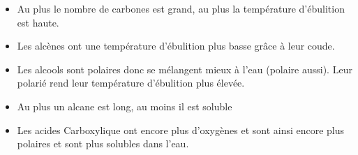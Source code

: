 \documentclass[a4paper]{article}
\begin{document}
    \begin{itemize}
        \item Au plus le nombre de carbones est grand, au plus la température d'ébulition est haute.
        \item Les alcènes ont une température d'ébulition plus basse grâce à leur coude.
        \item Les alcools sont polaires donc se mélangent mieux à l'eau (polaire aussi). Leur polarié rend leur température d'ébulition plus élevée.
        \item Au plus un alcane est long, au moins il est soluble
        \item Les acides Carboxylique ont encore plus d'oxygènes et sont ainsi encore plus polaires et sont plus solubles dans l'eau.
    \end{itemize}
\end{document}
